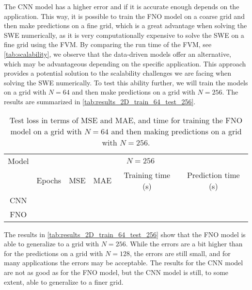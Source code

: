 The CNN model has a higher error and if it is accurate enough depends on the application.
This way, it is possible to train the FNO model on a coarse grid and then make predictions on a fine grid, which is a great advantage when solving the SWE numerically, as it is very computationally expensive to solve the SWE on a fine grid using the FVM.
By comparing the run time of the FVM, see \autoref{tab:scalability}, we observe that the data-driven models offer an alternative, which may be advantageous depending on the specific application.
This approach provides a potential solution to the scalability challenges we are facing when solving the SWE numerically.
To test this ability further, we will train the models on a grid with $N = 64$ and then make predictions on a grid with $N = 256$.
The results are summarized in \autoref{tab:results_2D_train_64_test_256}.
\begin{table}[H]
    \centering
    \begin{tabular}{c|ccccc}
        Model & \multicolumn{5}{c}{$N = 256$} \\
        \cline{2-6}
        & Epochs & MSE & MAE & Training time (s) & Prediction time (s) \\
        \hline
        CNN &
         &
         &
         &
         &
         \\
        FNO  &
         &
         &
         &
         &
         
    \end{tabular}
    \caption{Test loss in terms of MSE and MAE, and time for training the FNO model on a grid with $N = 64$ and then making predictions on a grid with $N = 256$.}\label{tab:results_2D_train_64_test_256}
\end{table}
The results in \autoref{tab:results_2D_train_64_test_256} show that the FNO model is able to generalize to a grid with $N = 256$.
While the errors are a bit higher than for the predictions on a grid with $N = 128$, the errors are still small, and for many applications the errors may be acceptable.
The results for the CNN model are not as good as for the FNO model, but the CNN model is still, to some extent, able to generalize to a finer grid.

